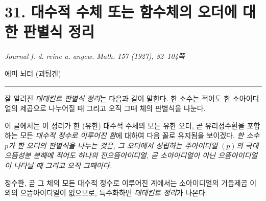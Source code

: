 
\providecommand{\mH}{\mathfrak H}
\providecommand{\mRprime}{\mathfrak R'}
\providecommand{\bP}{\overline P}
\providecommand{\bR}{\overline{\mathfrak R}}
\providecommand{\bp}{\overline{\mathfrak p}}
\providecommand{\mc}{\mathfrak c}
\providecommand{\mt}{\mathfrak t}
\providecommand{\mq}{\mathfrak q}
\providecommand{\mpideal}{\mathfrak p}
\providecommand{\mP}{\mathfrak P}

\section*{31. 대수적 수체 또는 함수체의 오더에 대한 판별식 정리}
\begin{center}
\emph{Journal f. d. reine u. angew. Math. 157 (1927), 82--104쪽}

에미 뇌터 (괴팅겐)\\[0.4em]
\rule{9em}{0.4pt}
\end{center}

잘 알려진 \emph{데데킨트 판별식 정리}는 다음과 같이 말한다. 한 소수는 적어도 한 소아이디얼의 제곱으로 나누어질 때 그리고 오직 그때 체의 판별식을 나눈다.

이 글에서는 이 정리가 한 (유한) 대수적 수체의 모든 유한 오더, 곧 유리정수환을 포함하는 모든 \emph{대수적 정수로 이루어진 환}에 대하여 다음 꼴로 유지됨을 보이겠다. \emph{한 소수 \(p\)가 한 오더의 판별식을 나누는 것은, 그 오더에서 성립하는 주아이디얼 \((p)\)의 극대 으뜸성분 분해에 적어도 하나의 진으뜸아이디얼, 곧 소아이디얼이 아닌 으뜸아이디얼이 나타날 때 그리고 오직 그때이다.}

정수환, 곧 그 체의 모든 대수적 정수로 이루어진 계에서는 소아이디얼의 거듭제곱 이외의 으뜸아이디얼이 없으므로, 특수화하면 \emph{데데킨트 정리}가 나온다.


